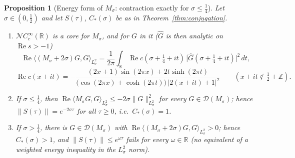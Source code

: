 \documentclass[11pt,a4paper]{article}
\newtheorem{prop}{Proposition}[section]
\begin{document}
\begin{prop}[Energy form of $M_\sigma$: contraction exactly for $\sigma\le\tfrac14$]
\label{prop:energy_form}
Let $\sigma\in(0,\tfrac12)$ and let $S(\tau)$, $C_*(\sigma)$ be as in Theorem~\ref{thm:conjugation}.
\begin{enumerate}
\item $\mathcal{N}C_c^\infty(\mathbb{R})$ is a core for $M_\sigma$, and for $G$ in it ($\widehat{G}$ is then analytic on $\operatorname{Re}s>-1$)
  \[
  \operatorname{Re}\langle(M_\sigma+2\sigma)G,G\rangle_{L^2_\sigma}
  =\frac{1}{2\pi}\int_{\mathbb{R}}\operatorname{Re}c(\sigma+\tfrac14+it)\,\bigl|\widehat{G}(\sigma+\tfrac14+it)\bigr|^2\,dt,
  \]
  \[
  \operatorname{Re}c(x+it)=-\frac{(2x+1)\sin(2\pi x)+2t\sinh(2\pi t)}{\bigl(\cos(2\pi x)+\cosh(2\pi t)\bigr)\,|2(x+it)+1|^2}
  \qquad(x+it\notin\tfrac12+\mathbb{Z}).
  \]
\item If $\sigma\le\tfrac14$, then $\operatorname{Re}\langle M_\sigma G,G\rangle_{L^2_\sigma}\le-2\sigma\|G\|^2_{L^2_\sigma}$ for every
  $G\in\mathcal{D}(M_\sigma)$; hence $\|S(\tau)\|=e^{-2\sigma\tau}$ for all $\tau\ge0$, i.e.\ $C_*(\sigma)=1$.
\item If $\sigma>\tfrac14$, there is $G\in\mathcal{D}(M_\sigma)$ with $\operatorname{Re}\langle(M_\sigma+2\sigma)G,G\rangle_{L^2_\sigma}>0$; hence
  $C_*(\sigma)>1$, and $\|S(\tau)\|\le e^{\omega\tau}$ fails for every $\omega\in\mathbb{R}$ (no equivalent of a weighted energy
  inequality in the $L^2_\sigma$ norm).
\end{enumerate}
\end{prop}
\end{document}
